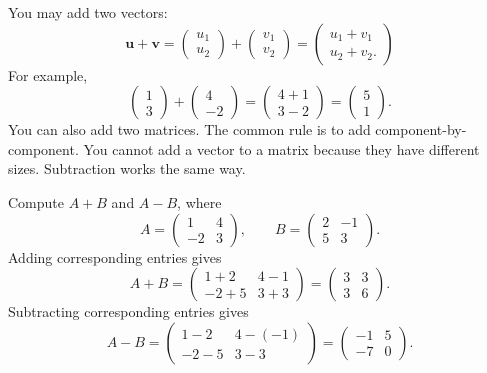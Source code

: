 \documentclass[10pt,letterpaper]{article}
\begin{document}
You may add two vectors: 
\[
\textbf{u}+\textbf{v}=
\begin{pmatrix}
u_1\\u_2
\end{pmatrix}
+
\begin{pmatrix}
v_1\\v_2
\end{pmatrix}
=
\begin{pmatrix}
u_1+v_1\\u_2+v_2.
\end{pmatrix}
\]
For example,
\[
\begin{pmatrix}1\\3\end{pmatrix}
+
\begin{pmatrix}4\\-2\end{pmatrix} = 
\begin{pmatrix}4+1\\3-2\end{pmatrix} = 
\begin{pmatrix}5\\1\end{pmatrix}.
\]
You can also add two matrices. The common rule is to add component-by-component. You cannot add a vector to a matrix because they have different sizes. Subtraction works the same way.

\begin{example}[2]{
Compute $A+B$ and $A-B$, where
\[
A=
\begin{pmatrix}
1&4\\
-2&3
\end{pmatrix},
\qquad
B=
\begin{pmatrix}
2&-1\\
5&3
\end{pmatrix}.
\]
}
Adding corresponding entries gives
\[
A+B=
\begin{pmatrix}
1+2&4-1\\
-2+5&3+3
\end{pmatrix}
=
\boxed{
\begin{pmatrix}
3&3\\
3&6
\end{pmatrix}.
}
\]
Subtracting corresponding entries gives
\[
A-B=
\begin{pmatrix}
1-2&4-(-1)\\
-2-5&3-3
\end{pmatrix}
=
\boxed{
\begin{pmatrix}
-1&5\\
-7&0
\end{pmatrix}.
}
\]
\end{example}
\end{document}
